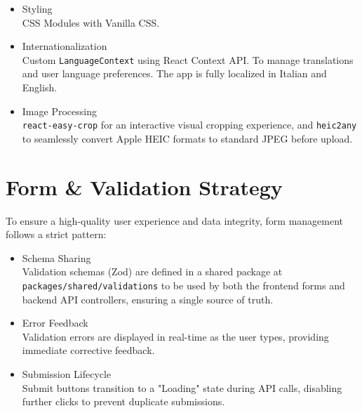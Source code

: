 \begin{itemize}
\begin{itemize}
    \end{itemize}
    \item Styling \\
        CSS Modules with Vanilla CSS.
    \item Internationalization \\
        Custom \texttt{LanguageContext} using React Context API. To manage translations and user language preferences. The app is fully localized in Italian and English.
    \item Image Processing \\
        \texttt{react-easy-crop} for an interactive visual cropping experience, and \texttt{heic2any} to seamlessly convert Apple HEIC formats to standard JPEG before upload.
\end{itemize}

\section{Form \& Validation Strategy}
To ensure a high-quality user experience and data integrity, form management follows a strict pattern:
\begin{itemize}
    \item Schema Sharing \\
        Validation schemas (Zod) are defined in a shared package at \texttt{packages/shared/validations} to be used by both the frontend forms and backend API controllers, ensuring a single source of truth.
    \item Error Feedback \\
        Validation errors are displayed in real-time as the user types, providing immediate corrective feedback.
    \item Submission Lifecycle \\
        Submit buttons transition to a "Loading" state during API calls, disabling further clicks to prevent duplicate submissions.
\end{itemize}

